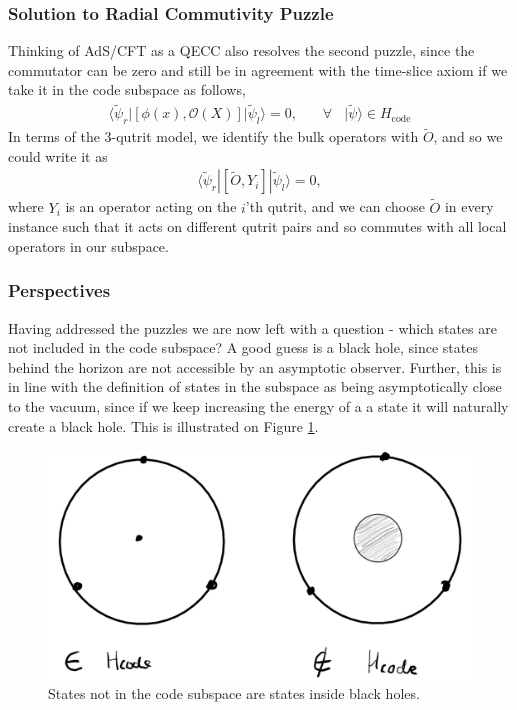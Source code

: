\documentclass[letter,12pt]{article}
\newcommand{\BO}{\mathcal{O}}
\begin{document}
\subsubsection*{Solution to Radial Commutivity Puzzle}
Thinking of AdS/CFT as a QECC also resolves the second puzzle, since the commutator can be zero and still be in agreement with the time-slice axiom if we take it in the code subspace as follows,
\begin{equation}
	\begin{aligned}
		\langle \tilde \psi_r |\left[\phi(x),\BO(X)\right]|\tilde \psi_l\rangle =0,~~~~~~~~\forall~~~~ |\tilde \psi\rangle\in H_{\text{code}}
	\end{aligned}
\end{equation}
In terms of the 3-qutrit model, we identify the bulk operators with $\tilde O$, and so we could write it as
\begin{equation}
	\begin{aligned}
		\langle \tilde \psi_r |[\tilde O,Y_i]|\tilde \psi_l\rangle =0,
	\end{aligned}
\end{equation}
where $Y_i$ is an operator acting on the $i$'th qutrit, and we can choose $\tilde O$ in every instance such that it acts on different qutrit pairs and so commutes with all local operators in our subspace.
\subsubsection*{Perspectives}
Having addressed the puzzles we are now left with a question - which states are not included in the code subspace? A good guess is a black hole, since states behind the horizon are not accessible by an asymptotic observer. Further, this is in line with the definition of states in the subspace as being asymptotically close to the vacuum, since if we keep increasing the energy of a a state it will naturally create a black hole. This is illustrated on Figure \ref{fig:adscftfig6}.
\begin{figure}[]
	\centering
	\includegraphics[width=0.7\linewidth]{ADS_CFT_Fig6}
	\caption{States not in the code subspace are states inside black holes.}
	\label{fig:adscftfig6}
\end{figure}
\end{document}
